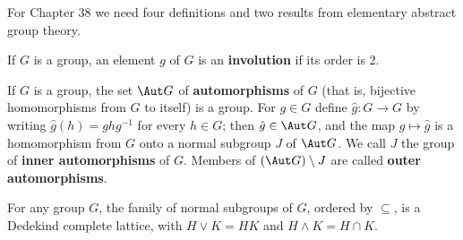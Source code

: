       
\def\chaptername{Appendix} 
\def\sectionname{Group Theory} 
      
      
For Chapter 38 we need four definitions and two results from elementary 
abstract group theory. 
      
 If $G$ is a group,  an 
element $g$ of $G$ is an {\bf involution} if its order is 
2. 
      
      
 If $G$ is a group, the set $\Aut G$ of 
{\bf automorphisms} of $G$ (that is, bijective homomorphisms from $G$ to 
itself) is a group.   For $g\in G$ define $\hat g:G\to G$ by writing 
$\hat g(h)=ghg^{-1}$ for every $h\in G$;  then $\hat g\in\Aut G$, and 
the map $g\mapsto\hat g$ is a homomorphism from $G$ onto a normal subgroup $J$ of $\Aut G$. 
We call $J$ the group of {\bf inner automorphisms} 
of $G$.   Members of $(\Aut G)\setminus J$ are called {\bf outer automorphisms}. 
      
 For any group $G$, the family of 
normal subgroups of $G$, ordered by $\subseteq$, 
is a Dedekind complete lattice, with $H\vee K=HK$ and 
$H\wedge K=H\cap K$.    
      
\frnewpage 
      
      
      
      
      
      
      
